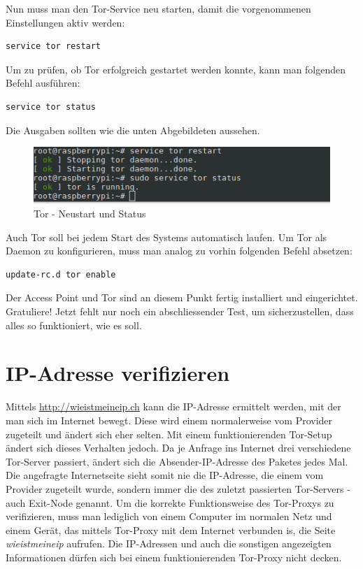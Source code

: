 Nun muss man den Tor-Service neu starten, damit die vorgenommenen Einstellungen aktiv werden:

\begin{lstlisting}
service tor restart
\end{lstlisting}

Um zu prüfen, ob Tor erfolgreich gestartet werden konnte, kann man folgenden Befehl ausführen:

\begin{lstlisting}
service tor status
\end{lstlisting}

Die Ausgaben sollten wie die unten Abgebildeten aussehen.

\begin{figure}[h]
\centering
\includegraphics[scale=0.7]{images/tor_service}
\caption{Tor - Neustart und Status}
\end{figure}

Auch Tor soll bei jedem Start des Systems automatisch laufen. Um Tor als Daemon zu konfigurieren, muss man analog zu vorhin folgenden Befehl absetzen:

\begin{lstlisting}
update-rc.d tor enable
\end{lstlisting}

Der Access Point und Tor sind an diesem Punkt fertig installiert und eingerichtet. Gratuliere! Jetzt fehlt nur noch ein abschliessender Test, um sicherzustellen, dass alles so funktioniert, wie es soll.

\section{IP-Adresse verifizieren}
Mittels \url{http://wieistmeineip.ch} kann die IP-Adresse ermittelt werden, mit der man sich im Internet bewegt. Diese wird einem normalerweise vom Provider zugeteilt und ändert sich eher selten. Mit einem funktionierenden Tor-Setup ändert sich dieses Verhalten jedoch. Da je Anfrage ins Internet drei verschiedene Tor-Server passiert, ändert sich die Absender-IP-Adresse des Paketes jedes Mal. Die angefragte Internetseite sieht somit nie die IP-Adresse, die einem vom Provider zugeteilt wurde, sondern immer die des zuletzt passierten Tor-Servers - auch Exit-Node genannt. Um die korrekte Funktionsweise des Tor-Proxys zu verifizieren, muss man lediglich von einem Computer im normalen Netz und einem Gerät, das mittels Tor-Proxy mit dem Internet verbunden is, die Seite \textit{wieistmeineip} aufrufen. Die IP-Adressen und auch die sonstigen angezeigten Informationen dürfen sich bei einem funktionierenden Tor-Proxy nicht decken.

